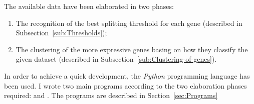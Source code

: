     The available data have been elaborated in two phases:
    \begin{enumerate}
    \item   The recognition of the best splitting threshold for each gene
             (described in Subsection~\ref{sub:Thresholds});
    \item   The clustering of the more expressive genes basing on how they
            classify the given dataset (described in
            Subsection~\ref{sub:Clustering-of-genes}).
    \end{enumerate}

    In order to achieve a quick development, the \emph{Python} programming
    language has been used. I wrote two main programs according to the two
    elaboration phases required:  and
    . The programs are described in
    Section~\ref{sec:Programs}


